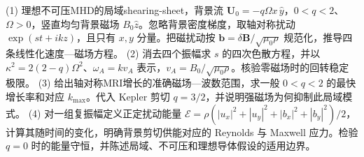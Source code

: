 (1) 理想不可压MHD的局域shearing-sheet，背景流 \(\mathbf U_0=-q\Omega x\,\hat y\)，\(0<q<2\)、\(\Omega>0\)，竖直均匀背景磁场 \(B_0\hat z\)。忽略背景密度梯度，取轴对称扰动 \(\exp(st+ikz)\)，且只有 \(x,y\) 分量。把磁扰动按 \(\boldsymbol b=\delta\mathbf B/\sqrt{\mu_0\rho}\) 规范化，推导四条线性化速度—磁场方程。
(2) 消去四个振幅求 \(s\) 的四次色散方程，并以 \(\kappa^2=2(2-q)\Omega^2\)、\(\omega_A=kv_A\) 表示，\(v_A=B_0/\sqrt{\mu_0\rho}\)。核验零磁场时的回转稳定极限。
(3) 给出轴对称MRI增长的准确磁场—波数范围，求一般 \(0<q<2\) 的最快增长率和对应 \(k_{\max}\)。代入 Kepler 剪切 \(q=3/2\)，并说明强磁场为何抑制此局域模式。
(4) 对一组复振幅定义正定扰动能量 \(\mathcal E=\rho(|u_x|^2+|u_y|^2+|b_x|^2+|b_y|^2)/2\)，计算其随时间的变化，明确背景剪切供能对应的 Reynolds 与 Maxwell 应力。检验 \(q=0\) 时的能量守恒，并陈述局域、不可压和理想导体假设的适用边界。
